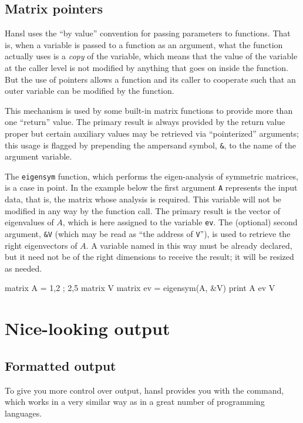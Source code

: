 \section{Matrix pointers}
\label{sec:mat-pointers}

Hansl uses the ``by value'' convention for passing parameters to
functions. That is, when a variable is passed to a function as an
argument, what the function actually uses is a \emph{copy} of the
variable, which means that the value of the variable at the caller
level is not modified by anything that goes on inside the function.
But the use of pointers allows a function and its caller to cooperate
such that an outer variable can be modified by the function.

This mechanism is used by some built-in matrix functions to provide
more than one ``return'' value. The primary result is always provided
by the return value proper but certain auxiliary values may be
retrieved via ``pointerized'' arguments; this usage is flagged by
prepending the ampersand symbol, \texttt{\&}, to the name of the
argument variable.

The \texttt{eigensym} function, which performs the eigen-analysis of
symmetric matrices, is a case in point. In the example below the first
argument \texttt{A} represents the input data, that is, the matrix
whose analysis is required. This variable will not be modified in any
way by the function call. The primary result is the vector of
eigenvalues of $A$, which is here assigned to the variable
\texttt{ev}. The (optional) second argument, \texttt{\&V} (which may
be read as ``the address of \texttt{V}''), is used to retrieve the
right eigenvectors of $A$. A variable named in this way must be
already declared, but it need not be of the right dimensions to
receive the result; it will be resized as needed.
\begin{code}
matrix A = {1,2 ; 2,5}
matrix V
matrix ev = eigensym(A, &V)
print A ev V
\end{code}

\chapter{Nice-looking output}
\label{chap:formatting}

\section{Formatted output}
\label{sec:printf}

To give you more control over output, hansl provides you with the
 command, which works in a very similar way as in a great
number of programming languages.

